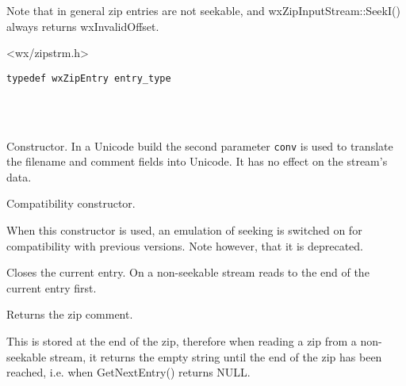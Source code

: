 Note that in general zip entries are not seekable, and
wxZipInputStream::SeekI() always returns wxInvalidOffset.




<wx/zipstrm.h>

\begin{verbatim}
typedef wxZipEntry entry_type
\end{verbatim}


\\
\\



\label{wxzipinputstreamwxzipinputstream}


Constructor. In a Unicode build the second parameter {\tt conv} is
used to translate the filename and comment fields into Unicode. It has
no effect on the stream's data.


Compatibility constructor.

When this constructor is used, an emulation of seeking is
switched on for compatibility with previous versions. Note however,
that it is deprecated.


\label{wxzipinputstreamcloseentry}


Closes the current entry. On a non-seekable stream reads to the end of
the current entry first.


\label{wxzipinputstreamgetcomment}


Returns the zip comment.

This is stored at the end of the zip, therefore when reading a zip
from a non-seekable stream, it returns the empty string until the
end of the zip has been reached, i.e. when GetNextEntry() returns
NULL.


